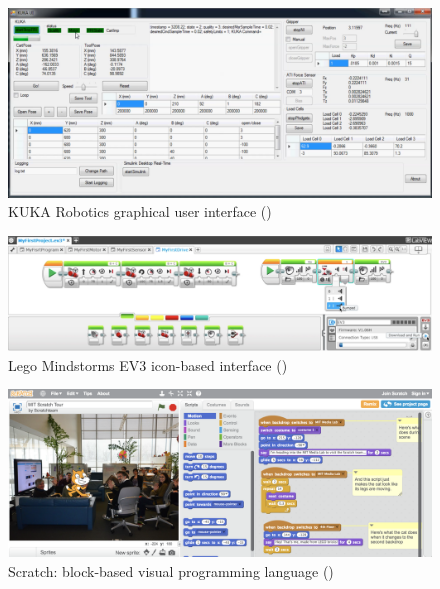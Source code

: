\clearpage
\begin{figure}[!h]
	\centering
	\includegraphics[width=0.99\linewidth]{figures/kuka-interface2}
	\caption{KUKA Robotics graphical user interface (\cite{abdeetedal2017kuka})}
	\label{fig:Kuka}
\end{figure} 
\begin{figure}[!h]
	\centering
	\includegraphics[width=\linewidth]{figures/lego-mindstorm2}
	\caption{Lego Mindstorms EV3 icon-based interface (\cite{lego2003})}
	\label{fig:lego-mindstorm}
\end{figure} 
\begin{figure}[!h]
	\centering
	\includegraphics[width=\linewidth]{figures/scratch-interface}
	\caption{Scratch: block-based visual programming language (\cite{majed2014learn})}
	\label{fig:scratch-interface}
\end{figure} 
\clearpage

